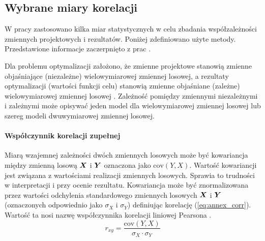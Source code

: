 
\renewcommand{\appendixname}{Załącznik}
\begin{appendices}

\chapter{Wybrane miary korelacji}

\setcounter{figure}{0}   
\setcounter{equation}{0}   

W pracy zastosowano kilka miar statystycznych w celu zbadania współzależności zmiennych projektowych i rezultatów. Poniżej zdefiniowano użyte metody. Przedstawione informacje zaczerpnięto z prac \cite{Czaja2000,Vargha2013,Tabachnick}.

Dla problemu optymalizacji założono, że zmienne projektowe stanowią zmienne objaśniające (niezależne) wielowymiarowej zmiennej losowej, a rezultaty optymalizacji (wartości funkcji celu) stanowią zmienne objaśniane (zależne) wielowymiarowej zmiennej losowej \cite{Czaja2000}. Zależność pomiędzy zmiennymi niezależnymi i zależnymi może opisywać jeden model dla wielowymiarowej zmiennej losowej lub szereg modeli dwuwymiarowej zmiennej losowej.

\subsubsection{Współczynnik korelacji zupełnej}
Miarą wzajemnej zależności dwóch zmiennych losowych może być kowariancja między zmienną losową $\bm{X}$ i $\bm{Y}$ oznaczona jako $\mathrm{cov}(Y,X)$. Wartość kowariancji jest związana z wartościami realizacji zmiennych losowych. Sprawia to trudności w interpretacji i przy ocenie rezultatu. Kowariancja może być znormalizowana przez wartości odchylenia standardowego zmiennych losowych $\bm{X}$ i $\bm{Y}$ (oznaczonych odpowiednio jako $\sigma_X$ i $\sigma_Y$) definiując korelację (\ref{eq:annex_corr}). Wartość ta nosi nazwę współczynnika korelacji liniowej Pearsona .
\begin{equation} \label{eq:annex_corr}
	r_{xy}=\frac{\mathrm{cov}(Y,X)}{\sigma_X\cdot\sigma_Y}
\end{equation}


\end{appendices}
